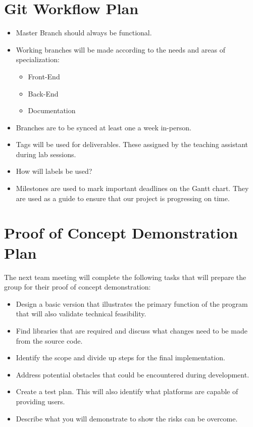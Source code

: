 \documentclass{article}
\begin{document}
\section{Git Workflow Plan}
\begin{itemize}
\item Master Branch should always be functional.
\item Working branches will be made according to the needs and areas of specialization:
\begin{itemize}
\item Front-End
\item Back-End
\item Documentation
\end{itemize}

\item Branches are to be synced at least one a week in-person. 
\item Tags will be used for deliverables. These assigned by the teaching assistant during lab sessions.

\item How will labels be used?
\item Milestones are used to mark important deadlines on the Gantt chart. They are used as a guide to ensure that our project is progressing on time.

\end{itemize}

\section{Proof of Concept Demonstration Plan}

The next team meeting will complete the following tasks that will prepare the group for their proof of concept demonstration:

\begin{itemize}
\item Design a basic version that illustrates the primary function of the program that will also validate technical feasibility.
\item Find libraries that are required and discuss what changes need to be made from the source code.
\item Identify the scope and divide up steps for the final implementation.
\item Address potential obstacles that could be encountered during development.
\item Create a test plan. This will also identify what platforms are capable of providing users.

\item Describe what you will demonstrate to show the risks can
be overcome.
\end{itemize}
\end{document}
